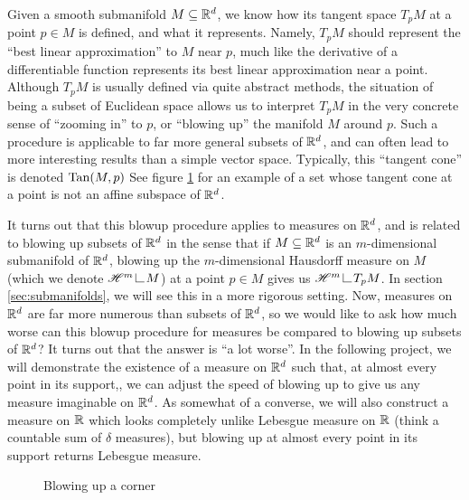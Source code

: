 Given a smooth submanifold $M \subseteq \mathbb{R}^d$, we know how its tangent space $T_pM$ at a point $p \in M$ is defined, and what it represents. Namely, $T_p M$ should represent the ``best linear approximation'' to $M$ near $p$, much like the derivative of a differentiable function represents its best linear approximation near a point. Although $T_p M$ is usually defined via quite abstract methods, the situation of being a subset of Euclidean space allows us to interpret $T_p M$ in the very concrete sense of ``zooming in'' to $p$, or ``blowing up'' the manifold $M$ around $p$. Such a procedure is applicable to far more general subsets of $\mathbb{R}^d$, and can often lead to more interesting results than a simple vector space. Typically, this ``tangent cone'' is denoted $\operatorname{Tan}(M,p)$ See figure \ref{fig:blowingUpCorner} for an example of a set whose tangent cone at a point is not an affine subspace of $\mathbb{R}^d$.

It turns out that this blowup procedure applies to measures on $\mathbb{R}^d$, and is related to blowing up subsets of $\mathbb{R}^d$ in the sense that if $M \subseteq \mathbb{R}^d$ is an $m$-dimensional submanifold of $\mathbb{R}^d$, blowing up the $m$-dimensional Hausdorff  measure on $M$ (which we denote $\scrH^m \restrict M$) at a point $p \in M$ gives us $\scrH^m \restrict T_pM$. In section \ref{sec:submanifolds}, we will see this in a more rigorous setting. Now, measures on $\mathbb{R}^d$ are far more numerous than subsets of $\mathbb{R}^d$, so we would like to ask how much worse can this blowup procedure for measures be compared to blowing up subsets of $\mathbb{R}^d$? It turns out that the answer is ``a lot worse''. In the following project, we will demonstrate the existence of a measure on $\mathbb{R}^d$ such that, at almost every point in its support,, we can adjust the speed of blowing up to give us any measure imaginable on $\mathbb{R}^d$. As somewhat of a converse, we will also construct a measure on $\mathbb{R}$ which looks completely unlike Lebesgue measure on $\mathbb{R}$ (think a countable sum of $\delta$ measures), but blowing up at almost every point in its support returns Lebesgue measure.

\begin{figure} \label{fig:blowingUpCorner}
    \centering

    \caption{Blowing up a corner}
\end{figure}